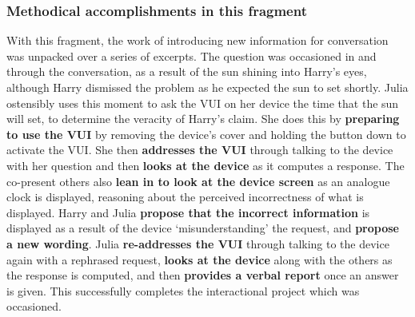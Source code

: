 


\crpagebreak\subsubsection{Methodical accomplishments in this fragment}\label{sec:empirical cafe findings newinfo methods}
\begin{revisedsubmission}
With this fragment, the work of introducing new information for conversation was unpacked over a series of excerpts.
The question was occasioned in and through the conversation, as a result of the sun shining into Harry's eyes, although Harry dismissed the problem as he expected the sun to set shortly.
Julia ostensibly uses this moment to ask the \ac{VUI} on her device the time that the sun will set, to determine the veracity of Harry's claim.
She does this by \textbf{preparing to use the \ac{VUI}} by removing the device's cover and holding the button down to activate the \ac{VUI}.
She then \textbf{addresses the \ac{VUI}} through talking to the device with her question and then \textbf{looks at the device} as it computes a response.
The co-present others also \textbf{lean in to look at the device screen} as an analogue clock is displayed, reasoning about the perceived incorrectness of what is displayed.
Harry and Julia \textbf{propose that the incorrect information} is displayed as a result of the device `misunderstanding' the request, and \textbf{propose a new wording}.
Julia \textbf{re-addresses the \ac{VUI}} through talking to the device again with a rephrased request, \textbf{looks at the device} along with the others as the response is computed, and then \textbf{provides a verbal report} once an answer is given.
This successfully completes the interactional project which was occasioned.
\end{revisedsubmission}







